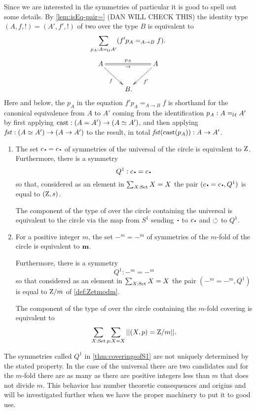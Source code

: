 \begin{remark}
Since we are interested in the symmetries of particular \coverings it is good to spell out some details.
By \cref{lem:isEq-pair=} (DAN WILL CHECK THIS) the identity type  
$(A,f,!)=(A',f',!)$ of two \coverings over the type $B$ is equivalent to 
\[
\sum_{p_A:A=_{\mathcal{U}}A'}(f'p_A=_{A\to B}f). 
\]
$$\xymatrix{A\ar@{=}[rr]^{p_A}_\to\ar[dr]_f&&A\ar[dl]^{f'}\\&\,B.&}$$
Here and below, the $p_A$ in the equation $f'p_A=_{A\to B}f$ is 
shorthand for the canonical equivalence from $A$ to $A'$ 
coming from the identification $p_A:A=_{\mathcal{U}}A'$ by first
applying $\mathrm{cast}:(A=A')\to (A\simeq A')$, and then
applying $\mathop{\mathit{fst}}:(A\simeq A')\to(A\to A')$ to the result,
in total $\mathop{\mathit{fst}}(\mathrm{cast}(p_A)): A\to A'$.
\end{remark}

\begin{theorem}
  \label{thm:coveringsofS1}
  \begin{enumerate}
  \item 
  The set $c_\base=c_\base$ of symmetries of the universal \covering of the circle is equivalent to $\mathrm{Z}$.  
Furthermore, there is a symmetry $$Q^1:c_\base=c_\base$$ so that, considered as an element in $\sum_{X:\mathord{\mathrm{Set}}}X=X$ the pair $(c_\base=c_\base,Q^1)$ is equal to $(\mathrm{Z},s)$.  

The component of the type of \coverings over the circle containing the universal \covering is equivalent to the circle via the map from $S^1$ sending $\base$ to $c_\base$ and $\circlearrowleft$ to $Q^1$.
\item For a positive integer $m$, the set $-^m=-^m$ of symmetries of the $m$-fold \covering of the circle is equivalent to $\mathbf{m}$.  

Furthermore, there is a symmetry $$Q^1:-^m=-^m$$ so that considered as an element in $\sum_{X:\mathord{\mathrm{Set}}}X=X$ the pair $(-^m=-^m,Q^1)$ is equal to $\mathrm{Z}/m$ of \cref{def:Zetmodm}.

The component of the type of \coverings over the circle containing the $m$-fold covering is equivalent to $$\sum_{X:\mathord{\mathrm{Set}}}\sum_{p:X=X}||(X,p)=\mathrm{Z}/m||.$$
  \end{enumerate}

 \end{theorem}
\begin{remark}\label{rem:thenonuniquenessofgeneratorsofmodulararithmetic1}
  The symmetries called $Q^1$ in \cref{thm:coveringsofS1} are not uniquely determined by the stated property.  
In the case of the universal \covering there are two candidates and for the $m$-fold \covering there are as many as there are positive integers less than $m$ that does not divide $m$.  
This behavior has number theoretic consequences and origins and will be investigated further when we have the proper machinery to put it to good use.
\end{remark}

